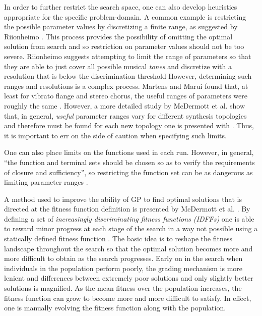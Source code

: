 \documentclass[12pt]{report} 	%
\numberwithin{figure}{chapter}
\numberwithin{table}{chapter}
\numberwithin{equation}{chapter}
\begin{document}
\begin{flushleft}
In order to further restrict the search space, one can also develop heuristics appropriate for the specific problem-domain. A common example is restricting the possible parameter values by discretizing a finite range, as suggested by Riionheimo \cite[p. 6]{Riionheimo:2003qo}. This process provides the possibility of omitting the optimal solution from search and so restriction on parameter values should not be too severe. Riionheimo suggests attempting to limit the range of parameters so that they are able to just cover all possible musical \textit{tones} and discretize with a resolution that is below the discrimination threshold \cite[p. 6]{Riionheimo:2003qo} However, determining such ranges and resolutions is a complex process. Martens and Marui found that, at least for vibrato flange and stereo chorus, the useful ranges of parameters were roughly the same \cite[p. 4]{Martens:2009lo}. However, a more detailed study by McDermott et al. show that, in general, \textit{useful} parameter ranges vary for different synthesis topologies and therefore must be found for each new topology one is presented with \cite[p. 5]{McDermott:2005xq}. Thus, it is important to err on the side of caution when specifying such limits. 

One can also place limits on the functions used in each run. However, in general, ``the function and terminal sets should be chosen so as to verify the requirements of closure and sufficiency'', so restricting the function set can be as dangerous as limiting parameter ranges \cite[p. 22]{Vanneschi:2004le}. 

A method used to improve the ability of GP to find optimal solutions that is directed at the fitness function definition is presented by McDermott et al. \cite{McDermott:2006ud}. By defining a set of \textit{increasingly discriminating fitness functions (IDFFs)} one is able to reward minor progress at each stage of the search in a way not possible using a statically defined fitness function \cite[p. 15]{McDermott:2006ud}. The basic idea is to reshape the fitness landscape throughout the search so that the optimal solution becomes more and more difficult to obtain as the search progresses. Early on in the search when individuals in the population perform poorly, the grading mechanism is more lenient and differences between extremely poor solutions and only slightly better solutions is magnified. As the mean fitness over the population increases, the fitness function can grow to become more and more difficult to satisfy. In effect, one is manually evolving the fitness function along with the population.


\end{flushleft}
\end{document}
